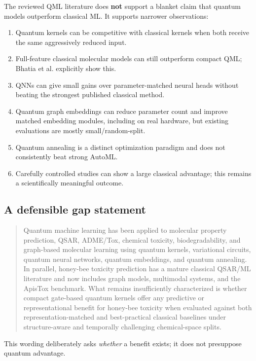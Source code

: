 \documentclass[11pt]{article}
\begin{document}
The reviewed QML literature does \textbf{not} support a blanket claim that quantum models outperform classical ML. It supports narrower observations:
\begin{enumerate}
    \item Quantum kernels can be competitive with classical kernels when both receive the same aggressively reduced input.
    \item Full-feature classical molecular models can still outperform compact QML; Bhatia et al. explicitly show this.
    \item QNNs can give small gains over parameter-matched neural heads without beating the strongest published classical method.
    \item Quantum graph embeddings can reduce parameter count and improve matched embedding modules, including on real hardware, but existing evaluations are mostly small/random-split.
    \item Quantum annealing is a distinct optimization paradigm and does not consistently beat strong AutoML.
    \item Carefully controlled studies can show a large classical advantage; this remains a scientifically meaningful outcome.
\end{enumerate}

\subsection{A defensible gap statement}

\begin{quote}
Quantum machine learning has been applied to molecular property prediction, QSAR, ADME/Tox, chemical toxicity, biodegradability, and graph-based molecular learning using quantum kernels, variational circuits, quantum neural networks, quantum embeddings, and quantum annealing. In parallel, honey-bee toxicity prediction has a mature classical QSAR/ML literature and now includes graph models, multimodal systems, and the ApisTox benchmark. What remains insufficiently characterized is whether compact gate-based quantum kernels offer any predictive or representational benefit for honey-bee toxicity when evaluated against both representation-matched and best-practical classical baselines under structure-aware and temporally challenging chemical-space splits.
\end{quote}

This wording deliberately asks \emph{whether} a benefit exists; it does not presuppose quantum advantage.
\end{document}
